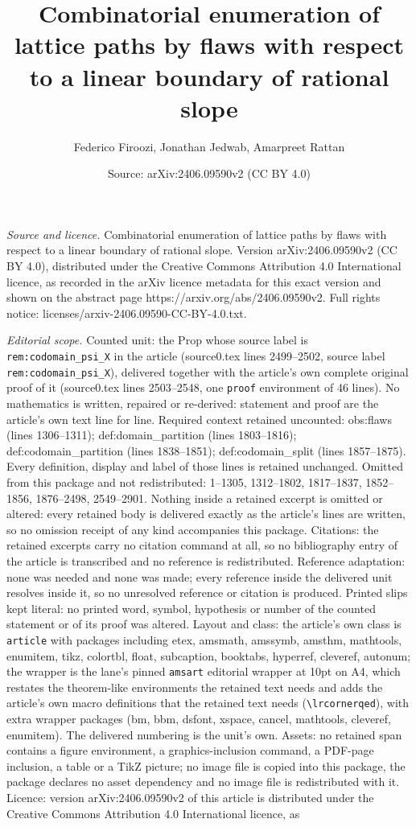 \documentclass[10pt,a4paper]{amsart}
\title[Combinatorial enumeration of lattice paths by flaws with res]{Combinatorial enumeration of lattice paths by flaws with respect to a linear boundary of rational slope}
\author{Federico Firoozi, Jonathan Jedwab, Amarpreet Rattan}
\date{Source: arXiv:2406.09590v2 (CC BY 4.0)}
\begin{document}
\maketitle

\noindent\emph{Source and licence.} Combinatorial enumeration of lattice paths by flaws with respect to a linear boundary of rational slope. Version arXiv:2406.09590v2 (CC BY 4.0), distributed under the Creative Commons Attribution 4.0 International licence, as recorded in the arXiv licence metadata for this exact version and shown on the abstract page https://arxiv.org/abs/2406.09590v2. Full rights notice: licenses/arxiv-2406.09590-CC-BY-4.0.txt.\par\smallskip

\noindent\textit{Editorial scope.} Counted unit: the Prop whose source label is \texttt{rem:codomain\_psi\_X} in the article (source0.tex lines 2499--2502, source label \texttt{rem:codomain\_psi\_X}), delivered together with the article's own complete original proof of it (source0.tex lines 2503--2548, one \texttt{proof} environment of 46 lines). No mathematics is written, repaired or re-derived: statement and proof are the article's own text line for line. Required context retained uncounted: obs:flaws (lines 1306--1311); def:domain\_partition (lines 1803--1816); def:codomain\_partition (lines 1838--1851); def:codomain\_split (lines 1857--1875). Every definition, display and label of those lines is retained unchanged. Omitted from this package and not redistributed: 1--1305, 1312--1802, 1817--1837, 1852--1856, 1876--2498, 2549--2901. Nothing inside a retained excerpt is omitted or altered: every retained body is delivered exactly as the article's lines are written, so no omission receipt of any kind accompanies this package. Citations: the retained excerpts carry no citation command at all, so no bibliography entry of the article is transcribed and no reference is redistributed. Reference adaptation: none was needed and none was made; every reference inside the delivered unit resolves inside it, so no unresolved reference or citation is produced. Printed slips kept literal: no printed word, symbol, hypothesis or number of the counted statement or of its proof was altered. Layout and class: the article's own class is \texttt{article} with packages including etex, amsmath, amssymb, amsthm, mathtools, enumitem, tikz, colortbl, float, subcaption, booktabs, hyperref, cleveref, autonum; the wrapper is the lane's pinned \texttt{amsart} editorial wrapper at 10pt on A4, which restates the theorem-like environments the retained text needs and adds the article's own macro definitions that the retained text needs (\texttt{\textbackslash lrcornerqed}), with extra wrapper packages (bm, bbm, dsfont, xspace, cancel, mathtools, cleveref, enumitem). The delivered numbering is the unit's own. Assets: no retained span contains a figure environment, a graphics-inclusion command, a PDF-page inclusion, a table or a TikZ picture; no image file is copied into this package, the package declares no asset dependency and no image file is redistributed with it. Licence: version arXiv:2406.09590v2 of this article is distributed under the Creative Commons Attribution 4.0 International licence, as 
\end{document}
